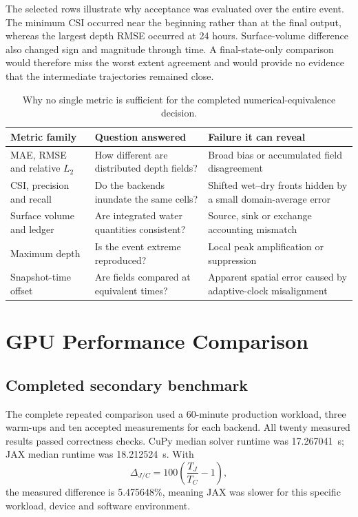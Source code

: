 \documentclass[11pt,a4paper,oneside]{report}
\begin{document}
The selected rows illustrate why acceptance was evaluated over the entire event. The minimum
CSI occurred near the beginning rather than at the final output, whereas the largest depth
RMSE occurred at 24 hours. Surface-volume difference also changed sign and magnitude through
time. A final-state-only comparison would therefore miss the worst extent agreement and
would provide no evidence that the intermediate trajectories remained close.

\begin{table}[H]
\centering
\caption[Complementary meaning of parity metrics.]{Why no single metric is sufficient for
the completed numerical-equivalence decision.}
\label{tab:metricroles}
\footnotesize
\begin{tabularx}{\textwidth}{|p{}|p{}|X|}
\hline
\textbf{Metric family} & \textbf{Question answered} & \textbf{Failure it can reveal} \\
\hline\hline
MAE, RMSE and relative $L_2$ & How different are distributed depth fields? & Broad bias or
accumulated field disagreement \\ \hdashline[0.4pt/1.2pt]
CSI, precision and recall & Do the backends inundate the same cells? & Shifted wet--dry
fronts hidden by a small domain-average error \\ \hdashline[0.4pt/1.2pt]
Surface volume and ledger & Are integrated water quantities consistent? & Source, sink or
exchange accounting mismatch \\ \hdashline[0.4pt/1.2pt]
Maximum depth & Is the event extreme reproduced? & Local peak amplification or suppression
\\ \hdashline[0.4pt/1.2pt]
Snapshot-time offset & Are fields compared at equivalent times? & Apparent spatial error
caused by adaptive-clock misalignment \\
\hline
\end{tabularx}
\end{table}

\chapter{GPU Performance Comparison}\label{chap:performance}
\section{Completed secondary benchmark}
The complete repeated comparison used a 60-minute production workload, three warm-ups and
ten accepted measurements for each backend. All twenty measured results passed correctness
checks. CuPy median solver runtime was \SI{17.267041}{\second}; JAX median runtime was
\SI{18.212524}{\second}. With
\begin{equation}
 \Delta_{J/C}=100\left(\frac{T_J}{T_C}-1\right),
\end{equation}
the measured difference is 5.475648\%, meaning JAX was slower for this specific workload,
device and software environment.
\end{document}
